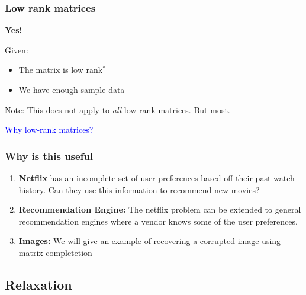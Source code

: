 \documentclass[
	11pt, %
]{beamer}
\begin{document}
\begin{frame}
	\frametitle{Low rank matrices}
	\vspace{-3em}
	\begin{center}
		{\huge \textbf{Yes!}}
	\end{center}	
	\vspace{2em}
	Given:
	\begin{itemize}
		\item The matrix is low rank$^*$
		\item We have enough sample data 
	\end{itemize}

	Note: This does not apply to \emph{all} low-rank matrices. But most.
	\vspace{1em}

	\pause

	\begin{center}
		\textcolor{blue}{Why low-rank matrices?}		
	\end{center}
\end{frame}

\begin{frame}
	\frametitle{Why is this useful}
	\begin{enumerate}
		\item \textbf{Netflix} has an incomplete set of user preferences based off their past watch history. Can they use this 
		 	   information to recommend new movies?
		\item \textbf{Recommendation Engine:} The netflix problem can be extended to general recommendation engines 
		where a vendor knows some of the user preferences.
		\item \textbf{Images:} We will give an example of recovering a corrupted image using matrix completetion
	\end{enumerate}
\end{frame}


\subsection{Relaxation} 
\end{document}
